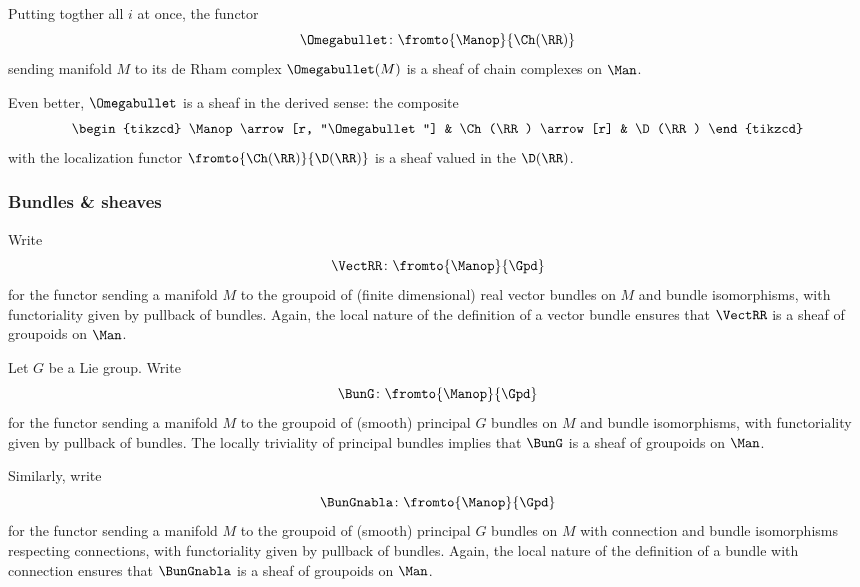 \begin{example}
	Putting togther all $ i $ at once, the functor
	\begin{equation*}
		\Omegabullet \colon \fromto{\Manop}{\Ch(\RR)}
	\end{equation*} 
	sending manifold $ M $ to its de Rham complex $ \Omegabullet(M) $ is a sheaf of chain complexes on $ \Man $.

	Even better, $ \Omegabullet $ is a sheaf in the derived sense: the composite
	\begin{equation*}
		\begin{tikzcd}
			\Manop \arrow[r, "\Omegabullet"] & \Ch(\RR) \arrow[r] & \D(\RR)
		\end{tikzcd}
	\end{equation*}
	with the localization functor $ \fromto{\Ch(\RR)}{\D(\RR)} $ is a sheaf valued in the \textit{\category} $ \D(\RR) $.
\end{example}


\subsubsection{Bundles \& sheaves}

\begin{example}
	Write
	\begin{equation*}
		\VectRR \colon \fromto{\Manop}{\Gpd}
	\end{equation*} 
	for the functor sending a manifold $ M $ to the groupoid of (finite dimensional) real vector bundles on $ M $ and bundle isomorphisms, with functoriality given by pullback of bundles.
	Again, the local nature of the definition of a vector bundle ensures that $ \VectRR  $ is a sheaf of groupoids on $ \Man $.
\end{example}

\begin{example}\label{ex:BunG}
	Let $ G $ be a Lie group.
	Write
	\begin{equation*}
		\BunG \colon \fromto{\Manop}{\Gpd}
	\end{equation*} 
	for the functor sending a manifold $ M $ to the groupoid of (smooth) principal $ G $ bundles on $ M $ and bundle isomorphisms, with functoriality given by pullback of bundles.
	The locally triviality of principal bundles implies that $ \BunG $ is a sheaf of groupoids on $ \Man $.

	Similarly, write
	\begin{equation*}
		\BunGnabla \colon \fromto{\Manop}{\Gpd}
	\end{equation*} 
	for the functor sending a manifold $ M $ to the groupoid of (smooth) principal $ G $ bundles on $ M $ with connection and bundle isomorphisms respecting connections, with functoriality given by pullback of bundles.
	Again, the local nature of the definition of a bundle with connection ensures that $ \BunGnabla  $ is a sheaf of groupoids on $ \Man $.
\end{example}

